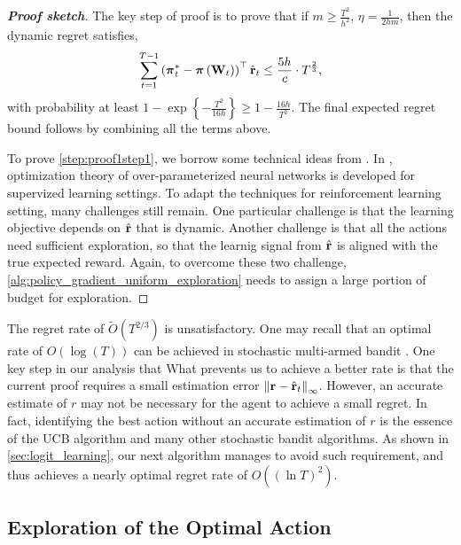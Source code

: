 \begin{proof}[\bf Proof sketch]
The key step of proof is to prove that if $m \ge \frac{T^2}{h^2}$, $\eta = \frac{1}{2 h m}$, then the dynamic regret satisfies,
\begin{equation}
\label{step:proof1step1}
\begin{split}
\sum\limits_{t=1}^{T-1}{ \left(  {{\boldsymbol{\pi}}_t^*} - {\boldsymbol{\pi}}\left( {\mathbf{W}}_t \right) \right)^\top \hat{{\mathbf{r}}}_t } \le \frac{5 h}{c} \cdot  T^{\frac{2}{3}},
\end{split}
\end{equation}
with probability at least $1 - \exp\left\{ - \frac{T^2}{16 h} \right\} \ge 1 - \frac{16 h}{T^2}$.
The final expected regret bound follows by combining all the terms above. 	

To prove \cref{step:proof1step1}, we borrow some technical ideas from \cite{li2018learning,allen2018convergenceB}. In \citep{li2018learning,allen2018convergenceB}, optimization theory of over-parameterized neural networks is developed for supervized learning settings. To adapt the techniques for reinforcement learning setting, many challenges still remain. One particular challenge is that the learning objective depends on $\hat{{\mathbf{r}}}$ that is dynamic. Another challenge is that all the actions need sufficient exploration, so that the learnig signal from $\hat{{\mathbf{r}}}$ is aligned with the true expected reward. Again, to overcome these two challenge, \cref{alg:policy_gradient_uniform_exploration} needs to assign a large portion of budget for exploration.
\end{proof}

\begin{remk}
The regret rate of $\tilde{O}(T^{2/3})$ is unsatisfactory. 
One may recall that an optimal rate of $O(\log(T))$ can be achieved in stochastic multi-armed bandit \citep{bubeck2012regret}. 
One key step in our analysis that 
What prevents us to achieve a better rate is that the current proof requires a small estimation error $\left\| {\mathbf{r}} - \hat{{\mathbf{r}}}_t \right\|_\infty$.
However, an accurate estimate of $r$ may not be necessary for the agent to achieve a small regret. 
In fact, identifying the best action without an accurate estimation of $r$ is the essence of the UCB algorithm and many other stochastic bandit algorithms. 
As shown in \cref{sec:logit_learning}, our next algorithm manages to avoid such requirement, and thus achieves a nearly optimal regret rate of $O((\ln T)^2)$.
\end{remk}

\iffalse
\subsection{Exploration of the Optimal Action}
\label{subsec:exploration_in_policy_learning}


